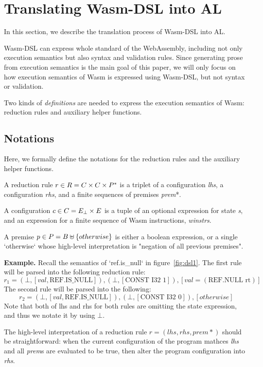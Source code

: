 \section{Translating Wasm-DSL into AL}\label{sec:translate}

In this section, we describe the translation process of Wasm-DSL into AL.

Wasm-DSL can express whole standard of the WebAssembly, including not only
execution semantics but also syntax and validation rules.
Since generating prose from execution semantics is the main goal of this paper,
we will only focus on how execution semantics of Wasm is expressed using Wasm-DSL, but not syntax or validation.

Two kinds of \textit{definitions} are needed to express the execution semantics of Wasm:
reduction rules and auxiliary helper functions.

\subsection{Notations}
Here, we formally define the notations for the reduction rules and the auxiliary helper functions.

A reduction rule $r \in R = C \times C \times P^\ast$ is a triplet of a
configuration \textit{lhs}, a configuration \textit{rhs}, and a finite sequences of premises \textit{prem}*.

A configuration $c \in C = E_\bot \times E$ is a tuple of an optional expression for state \textit{s},
and an expression for a finite sequence of Wasm instructions, \textit{winstrs}.

A premise $p \in P = B \uplus \{otherwise\}$ is either a boolean expression, or a
single `otherwise` whose high-level interpretation is "negation of all previous premises".

\textbf{Example.} Recall the semantics of `ref.is\_null` in figure~\ref{fig:dsl1}.
The first rule will be parsed into the following reduction rule:
\[r_1=(\bot, [val, \text{REF.IS\_NULL}]), (\bot, [\text{CONST I32 1}]), [val = (\text{REF.NULL rt})]\]
The second rule will be parsed into the following:
\[r_2=(\bot, [val, \text{REF.IS\_NULL}]), (\bot, [\text{CONST I32 0}]), [otherwise]\]
Note that both of lhs and rhs for both rules are omitting the state expression,
and thus we notate it by using $\bot$.

The high-level interpretation of a reduction rule $r = (lhs, rhs, prem*)$ should be straightforward:
when the current configuration of the program mathces \textit{lhs} and all \textit{prem}s are
evaluated to be true, then alter the program configuration into \textit{rhs}.

